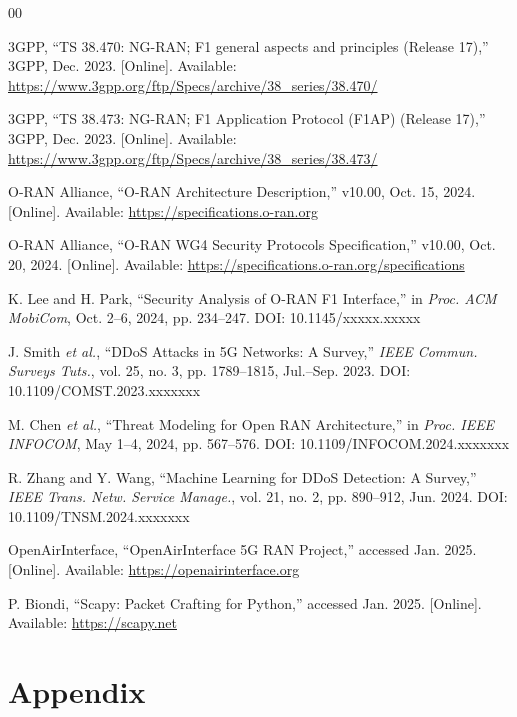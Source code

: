 \documentclass[conference]{IEEEtran}
\begin{document}
\begin{thebibliography}{00}

3GPP, ``TS 38.470: NG-RAN; F1 general aspects and principles (Release 17),'' 3GPP, Dec. 2023. [Online]. Available: \url{https://www.3gpp.org/ftp/Specs/archive/38_series/38.470/}

3GPP, ``TS 38.473: NG-RAN; F1 Application Protocol (F1AP) (Release 17),'' 3GPP, Dec. 2023. [Online]. Available: \url{https://www.3gpp.org/ftp/Specs/archive/38_series/38.473/}

O-RAN Alliance, ``O-RAN Architecture Description,'' v10.00, Oct. 15, 2024. [Online]. Available: \url{https://specifications.o-ran.org}

O-RAN Alliance, ``O-RAN WG4 Security Protocols Specification,'' v10.00, Oct. 20, 2024. [Online]. Available: \url{https://specifications.o-ran.org/specifications}

K. Lee and H. Park, ``Security Analysis of O-RAN F1 Interface,'' in \textit{Proc. ACM MobiCom}, Oct. 2--6, 2024, pp. 234--247. DOI: 10.1145/xxxxx.xxxxx

J. Smith \textit{et al.}, ``DDoS Attacks in 5G Networks: A Survey,'' \textit{IEEE Commun. Surveys Tuts.}, vol. 25, no. 3, pp. 1789--1815, Jul.--Sep. 2023. DOI: 10.1109/COMST.2023.xxxxxxx

M. Chen \textit{et al.}, ``Threat Modeling for Open RAN Architecture,'' in \textit{Proc. IEEE INFOCOM}, May 1--4, 2024, pp. 567--576. DOI: 10.1109/INFOCOM.2024.xxxxxxx

R. Zhang and Y. Wang, ``Machine Learning for DDoS Detection: A Survey,'' \textit{IEEE Trans. Netw. Service Manage.}, vol. 21, no. 2, pp. 890--912, Jun. 2024. DOI: 10.1109/TNSM.2024.xxxxxxx

OpenAirInterface, ``OpenAirInterface 5G RAN Project,'' accessed Jan. 2025. [Online]. Available: \url{https://openairinterface.org}

P. Biondi, ``Scapy: Packet Crafting for Python,'' accessed Jan. 2025. [Online]. Available: \url{https://scapy.net}

\end{thebibliography}

\section*{Appendix}
\end{document}
